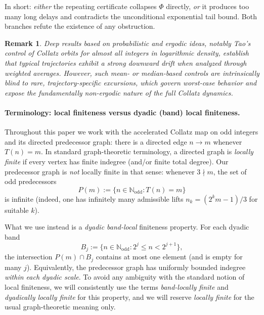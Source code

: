 \documentclass[preprint,12pt]{elsarticle}
\newtheorem{remark}{Remark}
\begin{document}
\noindent
In short: \emph{either} the repeating certificate collapses $\Phi$ directly, \emph{or} it produces too many long delays and contradicts the unconditional exponential tail bound. Both branches refute the existence of any obstruction.

\begin{remark}
Deep results based on probabilistic and ergodic ideas, notably Tao’s control of Collatz orbits for almost all integers in logarithmic density, establish that typical trajectories exhibit a strong downward drift when analyzed through weighted averages.
However, such mean- or median-based controls are intrinsically blind to rare, trajectory-specific excursions, which govern worst-case behavior and expose the fundamentally non-ergodic nature of the full Collatz dynamics.
\end{remark}

\paragraph{Terminology: local finiteness versus dyadic (band) local finiteness.}
Throughout this paper we work with the accelerated Collatz map on odd integers and its directed predecessor graph: there is a directed edge $n\to m$ whenever $T(n)=m$.
In standard graph-theoretic terminology, a directed graph is \emph{locally finite} if every vertex has finite indegree (and/or finite total degree).
Our predecessor graph is \emph{not} locally finite in that sense: whenever $3\nmid m$, the set of odd predecessors
\[
P(m):=\{n\in\mathbb{N}_{\mathrm{odd}}:T(n)=m\}
\]
is infinite (indeed, one has infinitely many admissible lifts $n_k=(2^k m-1)/3$ for suitable $k$).

What we use instead is a \emph{dyadic band-local} finiteness property.
For each dyadic band
\[
B_j := \{n\in\mathbb{N}_{\mathrm{odd}} : 2^j \le n < 2^{j+1}\},
\]
the intersection $P(m)\cap B_j$ contains at most one element (and is empty for many $j$).
Equivalently, the predecessor graph has uniformly bounded indegree \emph{within each dyadic scale}.
To avoid any ambiguity with the standard notion of local finiteness, we will consistently use the terms
\emph{band-locally finite} and \emph{dyadically locally finite} for this property, and we will reserve
\emph{locally finite} for the usual graph-theoretic meaning only.

\end{document}
